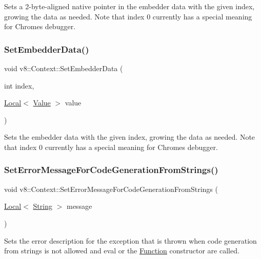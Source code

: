 Sets a 2-\/byte-\/aligned native pointer in the embedder data with the given index, growing the data as needed. Note that index 0 currently has a special meaning for Chrome\textquotesingle{}s debugger. \mbox{\label{classv8_1_1Context_a1f2f3da0b9c3d9b68a5384b757d607d2}} 
\subsubsection{\texorpdfstring{Set\+Embedder\+Data()}{SetEmbedderData()}}
{\footnotesize\ttfamily void v8\+::\+Context\+::\+Set\+Embedder\+Data (\begin{DoxyParamCaption}\item[{int}]{index,  }\item[{\mbox{\hyperlink{classv8_1_1Local}{Local}}$<$ \mbox{\hyperlink{classv8_1_1Value}{Value}} $>$}]{value }\end{DoxyParamCaption})}

Sets the embedder data with the given index, growing the data as needed. Note that index 0 currently has a special meaning for Chrome\textquotesingle{}s debugger. \mbox{\label{classv8_1_1Context_a8c919ccddb6fbb65602f7fe2587e8a34}} 
\subsubsection{\texorpdfstring{Set\+Error\+Message\+For\+Code\+Generation\+From\+Strings()}{SetErrorMessageForCodeGenerationFromStrings()}}
{\footnotesize\ttfamily void v8\+::\+Context\+::\+Set\+Error\+Message\+For\+Code\+Generation\+From\+Strings (\begin{DoxyParamCaption}\item[{\mbox{\hyperlink{classv8_1_1Local}{Local}}$<$ \mbox{\hyperlink{classv8_1_1String}{String}} $>$}]{message }\end{DoxyParamCaption})}

Sets the error description for the exception that is thrown when code generation from strings is not allowed and \textquotesingle{}eval\textquotesingle{} or the \textquotesingle{}\mbox{\hyperlink{classv8_1_1Function}{Function}}\textquotesingle{} constructor are called. \mbox{\label{classv8_1_1Context_a2351d9bdf4450d5f23734033289ba3ab}} 
